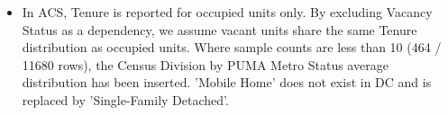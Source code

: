 \begin{itemize}
\item In ACS, Tenure is reported for occupied units only. By excluding Vacancy Status as a dependency, we assume vacant units share the same Tenure distribution as occupied units. Where sample counts are less than 10 (464 / 11680 rows), the Census Division by PUMA Metro Status average distribution has been inserted. 'Mobile Home' does not exist in DC and is replaced by 'Single-Family Detached'.
\end{itemize}
